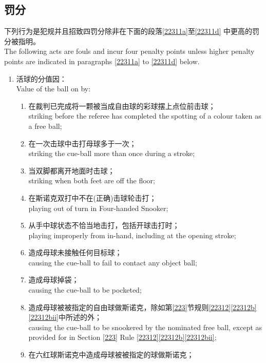 \subsection{罚分}\label{22311}

\noindent 下列行为是犯规并且招致四罚分除非在下面的段落\ref{22311a}至\ref{22311d} 中更高的罚分被指明。\\
The following acts are fouls and incur four penalty points unless higher penalty points are indicated in paragraphs \ref{22311a} to \ref{22311d} below.
\begin{enumerate}[label=(\alph*),start=1]
    \item \label{22311a}活球的分值因：\\
    Value of the ball on by:
    \begin{enumerate}[label=(\roman*)]
        \item \label{22311ai}在裁判已完成将一颗被当成自由球的彩球摆上点位前击球；\\
        striking before the referee has completed the spotting of a colour taken as a free ball;
        \item 在一次击球中击打母球多于一次；\\
        striking the cue-ball more than once during a stroke;
        \item \label{22311aiii}当双脚都离开地面时击球；\\
        striking when both feet are off the floor;
        \item 在斯诺克双打中不在(正确)击球轮击打；\\
        playing out of turn in Four-handed Snooker;
        \item 从手中球状态不恰当地击打，包括开球击打时；\\
        playing improperly from in-hand, including at the opening stroke;
        \item 造成母球未接触任何目标球；\\
        causing the cue-ball to fail to contact any object ball;
        \item 造成母球掉袋；\\
        causing the cue-ball to be pocketed;
        \item 造成母球被被指定的自由球做斯诺克，除如第\ref{223}节规则\ref{22312}\ref{22312b}\ref{22312bii}中所述的外；\\
        causing the cue-ball to be snookered by the nominated free ball, except as provided for in Section \ref{223} Rule \ref{22312}\ref{22312b}\ref{22312bii};
        \item 在六红球斯诺克中造成母球被被指定的球做斯诺克；\\

\end{enumerate}
\end{enumerate}

